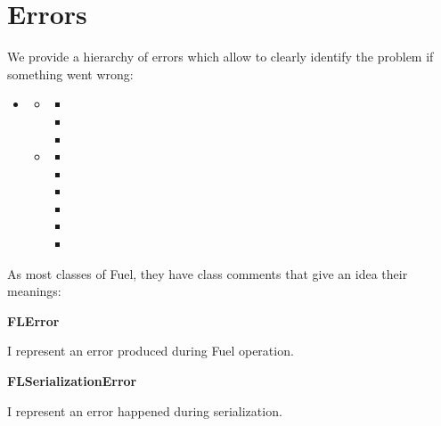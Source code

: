 \documentclass[a4paper,10pt,twoside]{book}
\begin{document}

\section{Errors}

We provide a hierarchy of errors which allow to clearly identify the problem if something went wrong:

\begin{itemize}
\item  {}\begin{itemize}
\item  {}\begin{itemize}
\item  {}
\item  {}
\item  {}
\end{itemize}

\item  {}\begin{itemize}
\item  {}
\item  {}
\item  {}
\item  {}
\item  {}
\item  {}
\end{itemize}

\end{itemize}

\end{itemize}

As most classes of Fuel, they have class comments that give an idea their meanings:

\begin{list}{}{}
\item\hspace{-\labelwidth}\textbf{ FLError}
\item  I represent an error produced during Fuel operation.
\end{list}

\begin{list}{}{}
\item\hspace{-\labelwidth}\textbf{ FLSerializationError}
\item  I represent an error happened during serialization.
\end{list}
\end{document}
